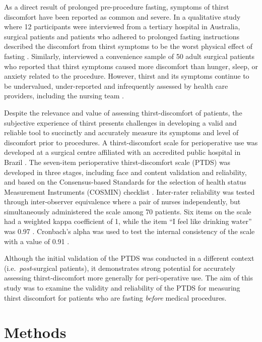 \documentclass[12pt,twocolumn,twoside,]{pinp}
\begin{document}
As a direct result of prolonged pre-procedure fasting, symptoms of
thirst discomfort have been reported as common and severe. In a
qualitative study where 12 participants were interviewed from a tertiary
hospital in Australia, surgical patients and patients who adhered to
prolonged fasting instructions described the discomfort from thirst
symptoms to be the worst physical effect of fasting
\citep{carey2015qualitative}. Similarly, \citep{madsen1998perioperative}
interviewed a convenience sample of 50 adult surgical patients who
reported that thirst symptoms caused more discomfort than hunger, sleep,
or anxiety related to the procedure. However, thirst and its symptoms
continue to be undervalued, under-reported and infrequently assessed by
health care providers, including the nursing team
\citep{milani2016thirst}.

Despite the relevance and value of assessing thirst-discomfort of
patients, the subjective experience of thirst presents challenges in
developing a valid and reliable tool to succinctly and accurately
measure its symptoms and level of discomfort prior to procedures. A
thirst-discomfort scale for perioperative use was developed at a
surgical centre affiliated with an accredited public hospital in Brazil
\citep{Martins_2017}. The seven-item perioperative thirst-discomfort
scale (PTDS) was developed in three stages, including face and content
validation and reliability, and based on the Consensus-based Standards
for the selection of health status Measurement Instruments (COSMIN)
checklist \citep{mokkink2010cosmin}. Inter-rater reliability was tested
through inter-observer equivalence where a pair of nurses independently,
but simultaneously administered the scale among 70 patients. Six items
on the scale had a weighted kappa coefficient of 1, while the item ``I
feel like drinking water'' was 0.97 \citep{Martins_2017}. Cronbach's
alpha was used to test the internal consistency of the scale with a
value of 0.91 \citep{Martins_2017}.

Although the initial validation of the PTDS was conducted in a different
context (i.e.~\emph{post}-surgical patients), it demonstrates strong
potential for accurately assessing thirst-discomfort more generally for
peri-operative use. The aim of this study was to examine the validity
and reliability of the PTDS for measuring thirst discomfort for patients
who are fasting \emph{before} medical procedures.

\hypertarget{methods}{%
\section{Methods}\label{methods}}
\end{document}
